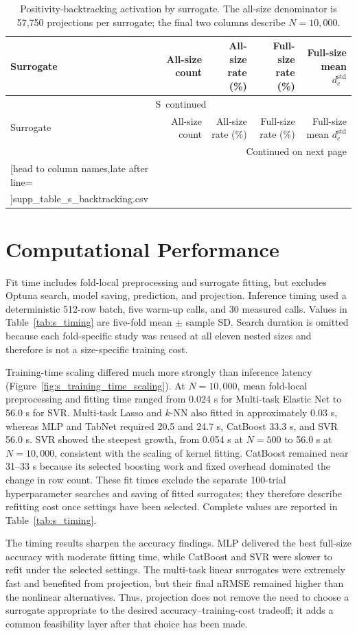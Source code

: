 \documentclass[a4paper,10pt]{article}
\newcommand{\csvrowsfive}[1]{%
  \csvreader[head to column names,late after line=\\]{#1}{}{\colA & \colB & \colC & \colD & \colE}}
\newcommand{\csvlongtable}[7]{%
  \begin{longtable}{#1}
  \caption{#2}\label{#3}\\
  \toprule
  #5 \\
  \midrule
  \endfirsthead
  \multicolumn{#4}{c}{\tablename\ \thetable\ continued}\\
  \toprule
  #5 \\
  \midrule
  \endhead
  \midrule\multicolumn{#4}{r}{Continued on next page}\\
  \endfoot
  \bottomrule
  \endlastfoot
  #7{#6}
  \end{longtable}%
}
\renewcommand{\thetable}{S\arabic{table}}
\begin{document}
\begingroup
\small
\setlength{\tabcolsep}{4pt}
\csvlongtable
  {lrrrr}
  {Positivity-backtracking activation by surrogate. The all-size denominator is 57,750 projections per surrogate; the final two columns describe $N=10{,}000$.}
  {tab:s_backtracking}
  {5}
  {Surrogate & All-size count & All-size rate (\%) & Full-size rate (\%) & Full-size mean $d_c^{\mathrm{std}}$}
  {supp_table_s_backtracking.csv}
  {\csvrowsfive}
\endgroup

\section{Computational Performance}

Fit time includes fold-local preprocessing and surrogate fitting, but excludes Optuna search, model saving, prediction, and projection. Inference timing used a deterministic 512-row batch, five warm-up calls, and 30 measured calls. Values in Table~\ref{tab:s_timing} are five-fold mean $\pm$ sample SD. Search duration is omitted because each fold-specific study was reused at all eleven nested sizes and therefore is not a size-specific training cost.

Training-time scaling differed much more strongly than inference latency (Figure~\ref{fig:s_training_time_scaling}). At $N=10{,}000$, mean fold-local preprocessing and fitting time ranged from 0.024 s for Multi-task Elastic Net to 56.0 s for SVR. Multi-task Lasso and $k$-NN also fitted in approximately 0.03 s, whereas MLP and TabNet required 20.5 and 24.7 s, CatBoost 33.3 s, and SVR 56.0 s. SVR showed the steepest growth, from 0.054 s at $N=500$ to 56.0 s at $N=10{,}000$, consistent with the scaling of kernel fitting. CatBoost remained near 31--33 s because its selected boosting work and fixed overhead dominated the change in row count. These fit times exclude the separate 100-trial hyperparameter searches and saving of fitted surrogates; they therefore describe refitting cost once settings have been selected. Complete values are reported in Table~\ref{tab:s_timing}.

The timing results sharpen the accuracy findings. MLP delivered the best full-size accuracy with moderate fitting time, while CatBoost and SVR were slower to refit under the selected settings. The multi-task linear surrogates were extremely fast and benefited from projection, but their final nRMSE remained higher than the nonlinear alternatives. Thus, projection does not remove the need to choose a surrogate appropriate to the desired accuracy--training-cost tradeoff; it adds a common feasibility layer after that choice has been made.
\end{document}
